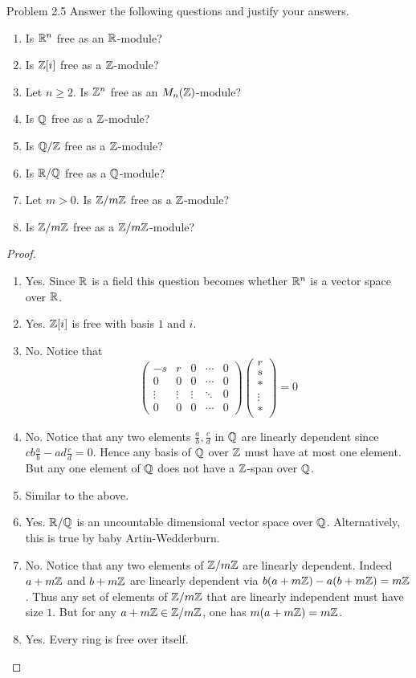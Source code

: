 \documentclass[a4paper]{article}
\begin{document}
\begin{ex}{Problem 2.5}{} Answer the following questions and justify your answers. 
\begin{enumerate}
\item Is $\mathbb{R}^n$ free as an $\mathbb{R}$-module?
\item Is $\mathbb{Z}[i]$ free as a $\mathbb{Z}$-module?
\item Let $n\geq 2$. Is $\mathbb{Z}^n$ free as an $M_n(\mathbb{Z})$-module?
\item Is $\mathbb{Q}$ free as a $\mathbb{Z}$-module?
\item Is $\mathbb{Q}/\mathbb{Z}$ free as a $\mathbb{Z}$-module?
\item Is $\mathbb{R}/\mathbb{Q}$ free as a $\mathbb{Q}$-module?
\item Let $m>0$. Is $\mathbb{Z}/m\mathbb{Z}$ free as a $\mathbb{Z}$-module?
\item Is $\mathbb{Z}/m\mathbb{Z}$ free as a $\mathbb{Z}/m\mathbb{Z}$-module?
\end{enumerate} \tcbline
\begin{proof}~\\
\begin{enumerate}
\item Yes. Since $\mathbb{R}$ is a field this question becomes whether $\mathbb{R}^n$ is a vector space over $\mathbb{R}$. 
\item Yes. $\mathbb{Z}[i]$ is free with basis $1$ and $i$. 

\item No. Notice that $$\begin{pmatrix}
-s & r & 0 & \cdots & 0\\
0 & 0 & 0 & \cdots & 0\\
\vdots & \vdots & \vdots & \ddots & 0\\
0 & 0 & 0 & \cdots & 0
\end{pmatrix}\begin{pmatrix}
r\\s\\\ast\\\vdots\\\ast
\end{pmatrix}=0$$

\item No. Notice that any two elements $\frac{a}{b},\frac{c}{d}$ in $\mathbb{Q}$ are linearly dependent since $cb\frac{a}{b}-ad\frac{c}{d}=0$. Hence any basis of $\mathbb{Q}$ over $\mathbb{Z}$ must have at most one element. But any one element of $\mathbb{Q}$ does not have a $\mathbb{Z}$-span over $\mathbb{Q}$. 
\item Similar to the above. 
\item Yes. $\mathbb{R}/\mathbb{Q}$ is an uncountable dimensional vector space over $\mathbb{Q}$. Alternatively, this is true by baby Artin-Wedderburn. 
\item No. Notice that any two elements of $\mathbb{Z}/m\mathbb{Z}$ are linearly dependent. Indeed $a+m\mathbb{Z}$ and $b+m\mathbb{Z}$ are linearly dependent via $b(a+m\mathbb{Z})-a(b+m\mathbb{Z})=m\mathbb{Z}$. Thus any set of elements of $\mathbb{Z}/m\mathbb{Z}$ that are linearly independent must have size $1$. But for any $a+m\mathbb{Z}\in\mathbb{Z}/m\mathbb{Z}$, one has $m(a+m\mathbb{Z})=m\mathbb{Z}$. 
\item Yes. Every ring is free over itself. 
\end{enumerate}
\end{proof}
\end{ex}
\end{document}
